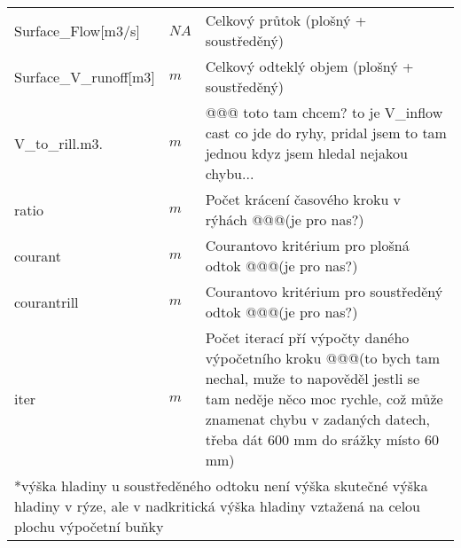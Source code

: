 \begin{table}
\begin{tabular}{llp{}}
 Surface\_Flow[m3/s]   &  $NA$ & Celkový průtok (plošný + soustředěný)  \\
 Surface\_V\_runoff[m3]   &   $m$  & Celkový odteklý objem (plošný + soustředěný) \\
 V\_to\_rill.m3. & $m$ &  @@@ toto tam chcem? to je V\_inflow cast co jde do ryhy, pridal jsem to tam jednou kdyz jsem hledal nejakou chybu...\\
 ratio & $m$ &  Počet krácení časového kroku v rýhách @@@(je pro nas?)\\
 courant & $m$ &  Courantovo kritérium pro plošná odtok @@@(je pro nas?)\\
 courantrill & $m$ & Courantovo kritérium pro soustředěný odtok @@@(je pro nas?) \\
 iter & $m$ &  Počet iterací pří výpočty daného výpočetního kroku @@@(to bych tam nechal, muže to napověděl jestli se tam neděje něco moc rychle, což může znamenat chybu v zadaných datech, třeba dát 600 mm do srážky místo 60 mm) \\
  \hline
   \hline
   \multicolumn{3}{p{\textwidth}}{*výška hladiny u soustředěného odtoku není výška skutečné výška hladiny v rýze, ale v nadkritická výška hladiny vztažená na celou plochu výpočetní buňky}
 \end{tabular}

\end{table}



